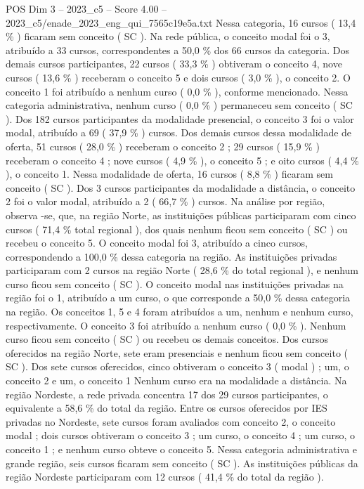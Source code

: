 \begin{textsample}{POS Dim 3 – 2023\_c5 – Score 4.00 – 2023\_c5/enade\_2023\_eng\_qui\_7565c19e5a.txt}
Nessa categoria, 16 cursos ( 13,4 \% ) ficaram sem conceito ( SC ).
Na rede pública, o conceito modal foi o 3, atribuído a 33 cursos, correspondentes a 50,0 \% dos 66 cursos da categoria.
Dos demais cursos participantes, 22 cursos ( 33,3 \% ) obtiveram o conceito 4, nove cursos ( 13,6 \% ) receberam o conceito 5 e dois cursos ( 3,0 \% ), o conceito 2.
O conceito 1 foi atribuído a nenhum curso ( 0,0 \% ), conforme mencionado.
Nessa categoria administrativa, nenhum curso ( 0,0 \% ) permaneceu sem conceito ( SC ).
Dos 182 cursos participantes da modalidade presencial, o conceito 3 foi o valor modal, atribuído a 69 ( 37,9 \% ) cursos.
Dos demais cursos dessa modalidade de oferta, 51 cursos ( 28,0 \% ) receberam o conceito 2 ; 29 cursos ( 15,9 \% ) receberam o conceito 4 ; nove cursos ( 4,9 \% ), o conceito 5 ; e oito cursos ( 4,4 \% ), o conceito 1.
Nessa modalidade de oferta, 16 cursos ( 8,8 \% ) ficaram sem conceito ( SC ).
Dos 3 cursos participantes da modalidade a distância, o conceito 2 foi o valor modal, atribuído a 2 ( 66,7 \% ) cursos.
Na análise por região, observa -se, que, na região Norte, as instituições públicas participaram com cinco cursos ( 71,4 \% total regional ), dos quais nenhum ficou sem conceito ( SC ) ou recebeu o conceito 5.
O conceito modal foi 3, atribuído a cinco cursos, correspondendo a 100,0 \% dessa categoria na região.
As instituições privadas participaram com 2 cursos na região Norte ( 28,6 \% do total regional ), e nenhum curso ficou sem conceito ( SC ).
O conceito modal nas instituições privadas na região foi o 1, atribuído a um curso, o que corresponde a 50,0 \% dessa categoria na região.
Os conceitos 1, 5 e 4 foram atribuídos a um, nenhum e nenhum curso, respectivamente.
O conceito 3 foi atribuído a nenhum curso ( 0,0 \% ).
Nenhum curso ficou sem conceito ( SC ) ou recebeu os demais conceitos.
Dos cursos oferecidos na região Norte, sete eram presenciais e nenhum ficou sem conceito ( SC ).
Dos sete cursos oferecidos, cinco obtiveram o conceito 3 ( modal ) ; um, o conceito 2 e um, o conceito 1 Nenhum curso era na modalidade a distância.
Na região Nordeste, a rede privada concentra 17 dos 29 cursos participantes, o equivalente a 58,6 \% do total da região.
Entre os cursos oferecidos por IES privadas no Nordeste, sete cursos foram avaliados com conceito 2, o conceito modal ; dois cursos obtiveram o conceito 3 ; um curso, o conceito 4 ; um curso, o conceito 1 ; e nenhum curso obteve o conceito 5.
Nessa categoria administrativa e grande região, seis cursos ficaram sem conceito ( SC ).
As instituições públicas da região Nordeste participaram com 12 cursos ( 41,4 \% do total da região ).

\end{textsample}
